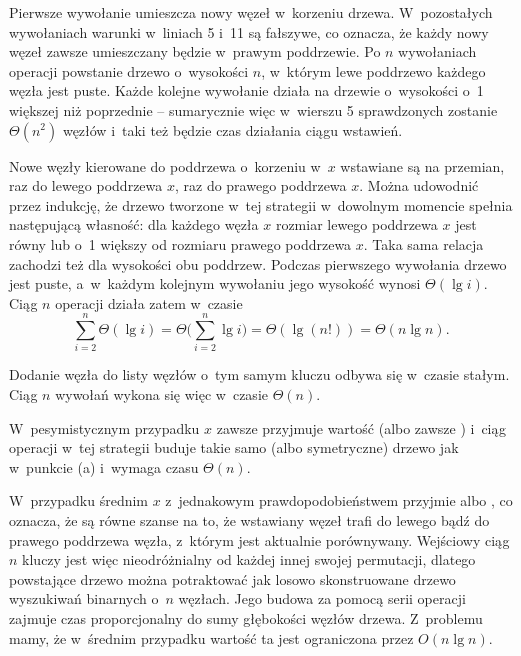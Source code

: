 
\subproblem %
Pierwsze wywołanie  umieszcza nowy węzeł w~korzeniu drzewa.
W~pozostałych wywołaniach warunki w~liniach 5 i~11 są fałszywe, co oznacza, że każdy nowy węzeł zawsze umieszczany będzie w~prawym poddrzewie.
Po $n$ wywołaniach operacji  powstanie drzewo o~wysokości $n$, w~którym lewe poddrzewo każdego węzła jest puste.
Każde kolejne wywołanie działa na drzewie o~wysokości o~1 większej niż poprzednie -- sumarycznie więc w~wierszu 5 sprawdzonych zostanie $\Theta(n^2)$ węzłów i~taki też będzie czas działania ciągu wstawień.

\subproblem %
Nowe węzły kierowane do poddrzewa o~korzeniu w~$x$ wstawiane są na przemian, raz do lewego poddrzewa $x$, raz do prawego poddrzewa $x$.
Można udowodnić przez indukcję, że drzewo tworzone w~tej strategii w~dowolnym momencie spełnia następującą własność: dla każdego węzła $x$ rozmiar lewego poddrzewa $x$ jest równy lub o~1 większy od rozmiaru prawego poddrzewa $x$.
Taka sama relacja zachodzi też dla wysokości obu poddrzew.
Podczas pierwszego wywołania  drzewo jest puste, a~w~każdym kolejnym wywołaniu jego wysokość wynosi $\Theta(\lg i)$.
Ciąg $n$ operacji  działa zatem w~czasie
\[
	\sum_{i=2}^n\Theta(\lg i) = \Theta\biggl(\sum_{i=2}^n\lg i\biggr) = \Theta(\lg(n!)) = \Theta(n\lg n).
\]

\subproblem %
Dodanie węzła do listy węzłów o~tym samym kluczu odbywa się w~czasie stałym.
Ciąg $n$ wywołań  wykona się więc w~czasie $\Theta(n)$.

\subproblem %
W~pesymistycznym przypadku $x$ zawsze przyjmuje wartość  (albo zawsze ) i~ciąg operacji  w~tej strategii buduje takie samo (albo symetryczne) drzewo jak w~punkcie (a) i~wymaga czasu $\Theta(n)$.

W~przypadku średnim $x$ z~jednakowym prawdopodobieństwem przyjmie  albo , co oznacza, że są równe szanse na to, że wstawiany węzeł trafi do lewego bądź do prawego poddrzewa węzła, z~którym jest aktualnie porównywany.
Wejściowy ciąg $n$ kluczy jest więc nieodróżnialny od każdej innej swojej permutacji, dlatego powstające drzewo można potraktować jak losowo skonstruowane drzewo wyszukiwań binarnych o~$n$ węzłach.
Jego budowa za pomocą serii operacji  zajmuje czas proporcjonalny do sumy głębokości węzłów drzewa.
Z~problemu  mamy, że w~średnim przypadku wartość ta jest ograniczona przez $O(n\lg n)$.
